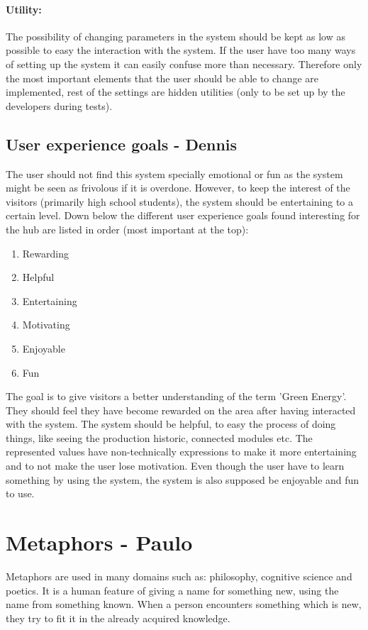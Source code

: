 \paragraph{Utility:}
The possibility of changing parameters in the system should be kept as low as possible to easy the interaction with the system. If the user have too many ways of setting up the system it can easily confuse more than necessary. Therefore only the most important elements that the user should be able to change are implemented, rest of the settings are hidden utilities (only to be set up by the developers during tests). 
\subsection{User experience goals - Dennis}
The user should not find this system specially emotional or fun as the system might be seen as frivolous if it is overdone. However, to keep the interest of the visitors (primarily high school students), the system should be entertaining to a certain level.  
Down below the different user experience goals found interesting for the hub are listed in order (most important at the top):
\begin{enumerate}
	\item Rewarding
	\item Helpful
	\item Entertaining
	\item Motivating
	\item Enjoyable
	\item Fun
\end{enumerate}
The goal is to give visitors a better understanding of the term 'Green Energy'. They should feel they have become rewarded on the area after having interacted with the system. The system should be helpful, to easy the process of doing things, like seeing the production historic, connected modules etc. The represented values have non-technically expressions to make it more entertaining and to not make the user lose motivation. Even though the user have to learn something by using the system, the system is also supposed be enjoyable and fun to use.

\section{Metaphors - Paulo}

Metaphors are used in many domains such as: philosophy, cognitive science and poetics. It is a human feature of giving a name for something new, using the name from something known. When a person encounters something which is new, they try to fit it in the already acquired knowledge.

